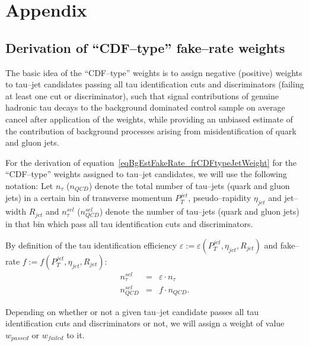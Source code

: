 \section{Appendix}

\subsection{Derivation of ``CDF--type'' fake--rate weights}
\label{secDerrivationCDFtypeFakeRateWeights}

The basic idea of the ``CDF--type'' weights is to assign negative (positive) weights to tau--jet candidates
passing all tau identification cuts and discriminators (failing at least one cut or discriminator),
such that signal contributions of genuine hadronic tau decays to the background dominated control sample 
on average cancel after application of the weights, while providing an unbiased estimate 
of the contribution of background processes arising from misidentification of quark and gluon jets.

For the derivation of equation~\ref{eqBgEstFakeRate_frCDFtypeJetWeight} for the ``CDF--type'' weights assigned to tau--jet candidates,
we will use the following notation:
Let $n_{\tau}$ ($n_{QCD}$) denote the total number of tau--jets (quark and gluon jets) in a certain bin of
transverse momentum $P_{T}^{jet}$, pseudo--rapidity $\eta_{jet}$ and jet--width $R_{jet}$ and
$n_{\tau}^{sel}$ ($n_{QCD}^{sel}$) denote the number of tau--jets (quark and gluon jets) in that bin 
which pass all tau identification cuts and discriminators.

By definition of the tau identification 
efficiency $\varepsilon := \varepsilon \left( P_{T}^{jet}, \eta_{jet}, R_{jet} \right)$ 
and 
fake--rate $f := f \left( P_{T}^{jet}, \eta_{jet}, R_{jet} \right)$:
\begin{eqnarray}
n_{\tau}^{sel} & = & \varepsilon \cdot n_{\tau} \nonumber \\
n_{QCD}^{sel} & = & f \cdot n_{QCD}.
\label{eqBgEstFakeRate_eff_and_frDef}
\end{eqnarray}

Depending on whether or not a given tau--jet candidate passes all tau identification cuts and discriminators or not,
we will assign a weight of value $w_{passed}$ or $w_{failed}$ to it.

